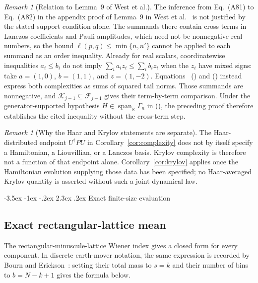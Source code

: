 \documentclass[twoside,10pt]{article}
\makeatletter
\numberwithin{equation}{section}
\theoremstyle{slbody}
\theoremstyle{definition}
\theoremstyle{remark}
\newtheorem{remark}[theorem]{Remark}
\newcommand{\1}{\mathbf{1}}
\renewcommand{\section}{%
  \@startsection{section}{1}{\z@}%
    {-3.5ex \@plus -1ex \@minus -.2ex}%
    {2.3ex \@plus .2ex}%
    {\normalfont\large\bfseries}}
\renewcommand{\eqref}[1]{%
  \textup{{\normalfont(\oldstylenums{\ref{#1}}}\normalfont)}}
\makeatother
\begin{document}
\begin{remark}[Relation to Lemma~9 of West et al.]
The inference from Eq.~(A81) to Eq.~(A82) in the appendix proof of Lemma~9 in
West et al.~\cite[Eqs.~(A81)--(A82)]{WestEtAl} is not justified by the stated
support condition alone.  The summands there contain cross terms in Lanczos
coefficients and Pauli
amplitudes, which need not be nonnegative real numbers, so the bound
$\ell(p,q)\leq\min\{n,n'\}$ cannot be applied to each summand as an order
inequality.  Already for real scalars, coordinatewise inequalities
$a_i\leq b_i$ do not imply $\sum_i a_iz_i\leq\sum_i b_iz_i$ when the $z_i$
have mixed signs: take $a=(1,0)$, $b=(1,1)$, and $z=(1,-2)$.  Equations~
\eqref{eq:graph-tail-projections} and
\eqref{eq:krylov-tail-projections} instead express both complexities as sums
of squared tail norms.  Those summands are nonnegative, and
$\mathcal K_{j-1}\subseteq\mathcal F_{j-1}$ gives their term-by-term
comparison.  Under the generator-supported hypothesis
$H\in\operatorname{span}_{\mathbb R}\Gamma_n$ in
\eqref{eq:matchgate-Hamiltonian}, the preceding proof therefore establishes
the cited inequality without the cross-term step.
\end{remark}

\begin{remark}[Why the Haar and Krylov statements are separate]
The Haar-distributed endpoint $U^\dagger P U$ in
Corollary~\ref{cor:complexity} does not by itself specify a Hamiltonian, a
Liouvillian, or a Lanczos basis.  Krylov complexity is therefore not a function
of that endpoint alone.  Corollary~\ref{cor:krylov} applies once the
Hamiltonian evolution supplying those data has been specified; no
Haar-averaged Krylov quantity is asserted without such a joint dynamical law.
\end{remark}

\section{Exact finite-size evaluation}

\subsection{Exact rectangular-lattice mean}

The rectangular-minuscule-lattice Wiener index gives a closed form for every
component.  In discrete earth-mover notation, the same expression is
recorded by Bourn and Erickson~\cite[Theorem~4.3]{BournErickson}: setting their total
mass to $s=k$ and their number of bins to $b=N-k+1$ gives the formula below.
\end{document}
